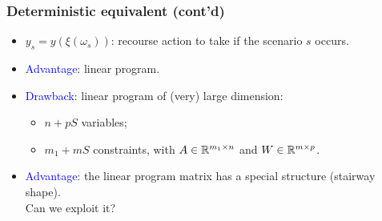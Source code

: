 \documentclass[aspectratio=169]{beamer}
\begin{document}
\begin{frame}
	\frametitle{Deterministic equivalent (cont'd)}
	
	\begin{itemize}
		\item
		$y_s = y(\xi(\omega_s))$: recourse action to take if the scenario
		$s$ occurs.
		\item
		\textcolor{blue}{Advantage}: linear program.
		\item
		\textcolor{blue}{Drawback}: linear program of (very) large dimension:
		\begin{itemize}
			\item
			$n+pS$ variables;
			\item
			$m_1+mS$ constraints, with $A \in {\mathbb{R}}^{m_1 \times n}$ and
			$W \in {\mathbb{R}}^{m \times p}$.
		\end{itemize}
		\item
		\textcolor{blue}{Advantage}: the linear program matrix has a special structure (stairway shape).\\
		Can we exploit it?
	\end{itemize}
	
\end{frame}
\end{document}
